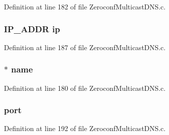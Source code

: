 Definition at line 182 of file Zeroconf\+Multicast\+D\+N\+S.\+c.

\hypertarget{struct__m_d_n_s_resource_record_a9d9dd79513ec44cebf281f569e85eadc}{}
\subsubsection[{ip}]{\setlength{\rightskip}{0pt plus 5cm}I\+P\+\_\+\+A\+D\+D\+R ip}\label{struct__m_d_n_s_resource_record_a9d9dd79513ec44cebf281f569e85eadc}


Definition at line 187 of file Zeroconf\+Multicast\+D\+N\+S.\+c.

\hypertarget{struct__m_d_n_s_resource_record_a8be36ea024fc971417695fc83b58febb}{}
\subsubsection[{name}]{$\ast$ name}\label{struct__m_d_n_s_resource_record_a8be36ea024fc971417695fc83b58febb}


Definition at line 180 of file Zeroconf\+Multicast\+D\+N\+S.\+c.

\hypertarget{struct__m_d_n_s_resource_record_a89033bfadfdf14dbf01960a1600fb682}{}
\subsubsection[{port}]{ port}\label{struct__m_d_n_s_resource_record_a89033bfadfdf14dbf01960a1600fb682}


Definition at line 192 of file Zeroconf\+Multicast\+D\+N\+S.\+c.

\hypertarget{struct__m_d_n_s_resource_record_a17a6eba9a7fe3cd1c3312e0d3bacc735}{}

